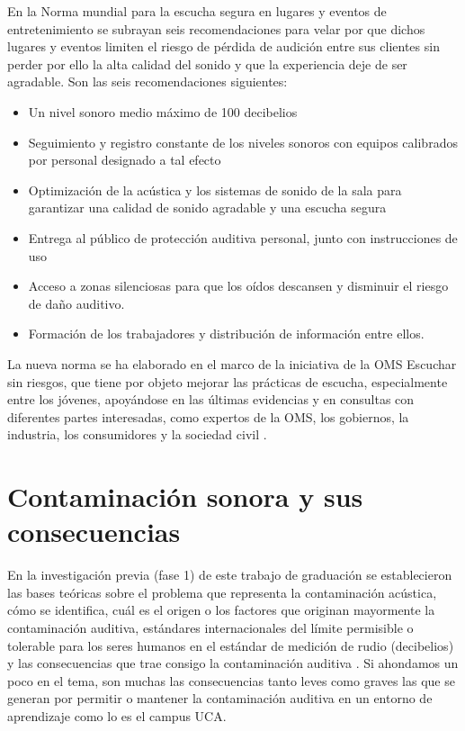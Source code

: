 {{En la Norma mundial para la escucha segura en lugares y eventos de entretenimiento se subrayan seis recomendaciones para velar por que dichos lugares y eventos limiten el riesgo de pérdida de audición entre sus clientes sin perder por ello la alta calidad del sonido y que la experiencia deje de ser agradable. Son las seis recomendaciones siguientes: 

 \begin{itemize}
     \item Un nivel sonoro medio máximo de 100 decibelios
     \item Seguimiento y registro constante de los niveles sonoros con equipos calibrados por personal designado a tal efecto
     \item Optimización de la acústica y los sistemas de sonido de la sala para garantizar una calidad de sonido agradable y una escucha segura
     \item Entrega al público de protección auditiva personal, junto con instrucciones de uso
     \item Acceso a zonas silenciosas para que los oídos descansen y disminuir el riesgo de daño auditivo.
     \item Formación de los trabajadores y distribución de información entre ellos.
 \end{itemize}

La nueva norma se ha elaborado en el marco de la iniciativa de la OMS Escuchar sin riesgos, que tiene por objeto mejorar las prácticas de escucha, especialmente entre los jóvenes, apoyándose en las últimas evidencias y en consultas con diferentes partes interesadas, como expertos de la OMS, los gobiernos, la industria, los consumidores y la sociedad civil \parencite{WHO2022}.  


\section{Contaminación sonora y sus consecuencias}

En la investigación previa (fase 1) de este trabajo de graduación se establecieron las bases teóricas sobre el problema que representa la contaminación acústica, cómo se identifica, cuál es el origen o los factores que originan mayormente la contaminación auditiva, estándares internacionales del límite permisible o tolerable para los seres humanos en el estándar de medición de rudio (decibelios) y las consecuencias que trae consigo la contaminación auditiva \parencite{carpio2025}. Si ahondamos un poco en el tema, son muchas las consecuencias tanto leves como graves las que se generan por permitir o mantener la contaminación auditiva en un entorno de aprendizaje como lo es el campus UCA.

}}
